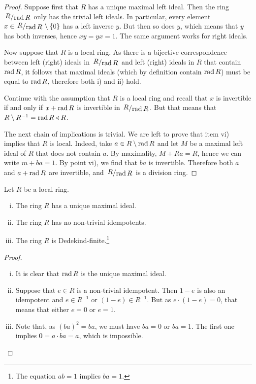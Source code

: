\begin{proof}
Suppose first that $R$ has a unique maximal left ideal. Then the
ring $\kvoc{R}{\rad R}$ only has the trivial left ideals. In
particular, every element
$x \in \kvoc{R}{\rad R} \setminus \set{0}$ has a left inverse $y$.
But then so does $y$, which means that $y$ has both inverses, hence
$xy = yx = 1$. The same argument works for right ideals.

Now suppose that $R$ is a local ring. As there is a bijective
correspondence between left (right) ideals in $\kvoc{R}{\rad R}$
and left (right) ideals in $R$ that contain $\operatorname{rad} R$, it follows
that maximal ideals (which by definition contain $\operatorname{rad} R$) must be
equal to $\operatorname{rad} R$, therefore both i) and ii) hold.

Continue with the assumption that $R$ is a local ring and recall
that $x$ is invertible if and only if $x + \operatorname{rad} R$ is invertible in
$\kvoc{R}{\rad R}$. But that means that
$R \setminus R^{-1} = \operatorname{rad} R \triangleleft R$.

The next chain of implications is trivial. We are left to prove
that item vi) implies that $R$ is local. Indeed, take
$a \in R \setminus \operatorname{rad} R$ and let $M$ be a maximal left ideal of
$R$ that does not contain $a$. By maximality, $M + Ra = R$, hence
we can write $m + ba = 1$. By point vi), we find that $ba$ is
invertible. Therefore both $a$ and $a + \operatorname{rad} R$ are invertible, and
$\kvoc{R}{\rad R}$ is a division ring.
\end{proof}

\begin{trditev}
Let $R$ be a local ring.

\begin{enumerate}[i)]
\item The ring $R$ has a unique maximal ideal.
\item The ring $R$ has no non-trivial idempotents.
\item The ring $R$ is Dedekind-finite.\footnote{The equation
$ab = 1$ implies $ba = 1$.}
\end{enumerate}
\end{trditev}

\begin{proof}
\phantom{i}
\begin{enumerate}[i)]
\item It is clear that $\operatorname{rad} R$ is the unique maximal ideal.
\item Suppose that $e \in R$ is a non-trivial idempotent. Then
$1-e$ is also an idempotent and $e \in R^{-1}$ or
$(1-e) \in R^{-1}$. But as $e \cdot (1-e) = 0$, that means that
either $e = 0$ or $e = 1$.
\item Note that, as $(ba)^2 = ba$, we must have $ba = 0$ or
$ba = 1$. The first one implies $0 = a \cdot ba = a$, which is
impossible. \qedhere
\end{enumerate}
\end{proof}


